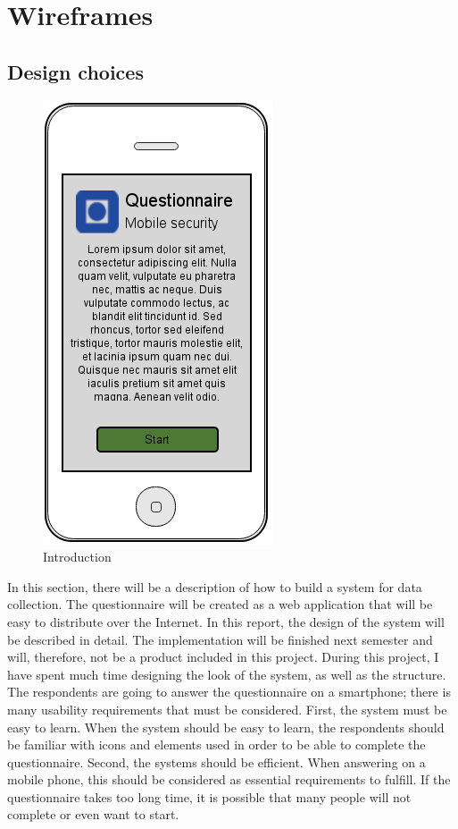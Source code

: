 \section{Wireframes}
\label{sec:wireframes}

  \subsection{Design choices}
    \begin{figure}
      \centering
      \vspace{-5pt}
      \includegraphics[scale=0.40]{screens/v3/mobile/mobile1-1.png}
      \caption{Introduction}
      \label{fig:wireframe1}
    \end{figure}
    
  In this section, there will be a description of how to build a system for data collection. The questionnaire will be created as a web application that will be easy to distribute over the Internet. In this report, the design of the system will be described in detail. The implementation will be finished next semester and will, therefore, not be a product included in this project. During this project, I have spent much time designing the look of the system, as well as the structure. The respondents are going to answer the questionnaire on a smartphone; there is many usability requirements that must be considered. First, the system must be easy to learn. When the system should be easy to learn, the respondents should be familiar with icons and elements used in order to be able to complete the questionnaire. Second, the systems should be efficient. When answering on a mobile phone, this should be considered as essential requirements to fulfill. If the questionnaire takes too long time, it is possible that many people will not complete or even want to start.


